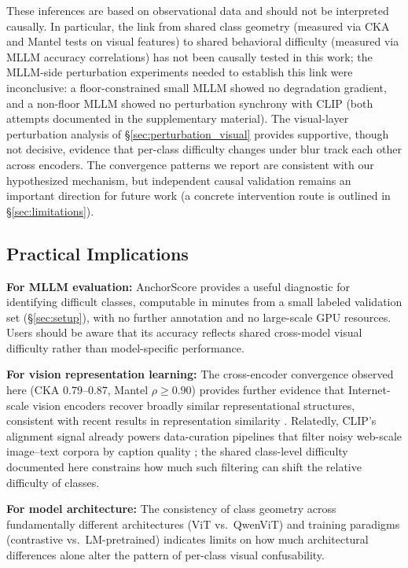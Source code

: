 \documentclass[a4paper,fleqn]{cas-sc}
\begin{document}
These inferences are based on observational data and should not be interpreted causally. In particular, the link from shared class geometry (measured via CKA and Mantel tests on visual features) to shared behavioral difficulty (measured via MLLM accuracy correlations) has not been causally tested in this work; the MLLM-side perturbation experiments needed to establish this link were inconclusive: a floor-constrained small MLLM showed no degradation gradient, and a non-floor MLLM showed no perturbation synchrony with CLIP (both attempts documented in the supplementary material). The visual-layer perturbation analysis of \S\ref{sec:perturbation_visual} provides supportive, though not decisive, evidence that per-class difficulty changes under blur track each other across encoders. The convergence patterns we report are consistent with our hypothesized mechanism, but independent causal validation remains an important direction for future work (a concrete intervention route is outlined in \S\ref{sec:limitations}).

\subsection{Practical Implications}

\textbf{For MLLM evaluation:} AnchorScore provides a useful diagnostic for identifying difficult classes, computable in minutes from a small labeled validation set (\S\ref{sec:setup}), with no further annotation and no large-scale GPU resources. Users should be aware that its accuracy reflects shared cross-model visual difficulty rather than model-specific performance.

\textbf{For vision representation learning:} The cross-encoder convergence observed here (CKA $0.79$--$0.87$, Mantel $\rho\geq0.90$) provides further evidence that Internet-scale vision encoders recover broadly similar representational structures, consistent with recent results in representation similarity \cite{kornblith2019similarity}. Relatedly, CLIP's alignment signal already powers data-curation pipelines that filter noisy web-scale image--text corpora by caption quality \cite{gadre2023datacomp}; the shared class-level difficulty documented here constrains how much such filtering can shift the relative difficulty of classes.

\textbf{For model architecture:} The consistency of class geometry across fundamentally different architectures (ViT vs.~QwenViT) and training paradigms (contrastive vs.~LM-pretrained) indicates limits on how much architectural differences alone alter the pattern of per-class visual confusability.
\end{document}
